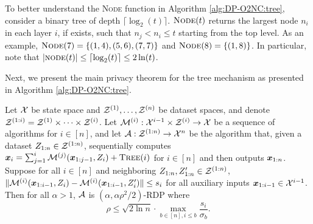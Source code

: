 \begin{remark}
\label{rmk:DP-O2NC:tree}
To better understand the \textsc{Node} function in Algorithm \ref{alg:DP-O2NC:tree}, consider a binary tree of depth $\lceil\log_2(t)\rceil$. $\textsc{Node}(t)$ returns the largest node $n_i$ in each layer $i$, if exists, such that $n_j<n_i\le t$ starting from the top level. As an example, $\textsc{Node}(7)=\{(1,4),(5,6),(7,7)\}$ and $\textsc{Node}(8)=\{(1,8)\}$. In particular, note that $|\textsc{node}(t)| \le \lceil\log_2(t)\rceil \le 2\ln(t)$.
\end{remark}

Next, we present the main privacy theorem for the tree mechanism as presented in Algorithm \ref{alg:DP-O2NC:tree}. 

\begin{theorem}
\label{thm:DP-O2NC:tree}
Let ${\cal X}$ be state space and ${\cal Z}^{(1)},\ldots,{\cal Z}^{(n)}$ be dataset spaces, and denote ${\cal Z}^{(1:i)}={\cal Z}^{(1)}\times\dotsm\times{\cal Z}^{(i)}$. Let ${\cal M}^{(i)}:{\cal X}^{i-1}\times{\cal Z}^{(i)} \to {\cal X}$ be a sequence of algorithms for $i\in[n]$, and let ${\cal A}:{\cal Z}^{(1:n)} \to {\cal X}^n$ be the algorithm that, given a dataset $Z_{1:n} \in {\cal Z}^{(1:n)}$, sequentially computes ${\boldsymbol{x}}_i = \sum_{j=1}^i{\cal M}^{(j)}({\boldsymbol{x}}_{1:j-1},Z_i)+\textsc{Tree}(i)$ for $i\in[n]$ and then outputs ${\boldsymbol{x}}_{1:n}$.
Suppose for all $i\in[n]$ and neighboring $Z_{1:n},Z_{1:n}'\in{\cal Z}^{(1:n)}$, $\|{\cal M}^{(i)}({\boldsymbol{x}}_{1:i-1},Z_i)-{\cal M}^{(i)}({\boldsymbol{x}}_{1:i-1},Z_i')\| \le s_i$ for all auxiliary inputs ${\boldsymbol{x}}_{1:i-1}\in{\cal X}^{i-1}$.
Then for all $\alpha>1$, ${\cal A}$ is $(\alpha, \alpha\rho^2/2)$-RDP where
\begin{equation*}
    \rho \le \sqrt{2\ln n} \cdot \max_{b\in[n], i\le b} \frac{s_i}{\sigma_b}.
\end{equation*}
\end{theorem}

